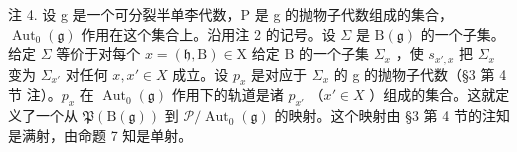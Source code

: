 注 4. 设 g 是一个可分裂半单李代数，P 是 g 的抛物子代数组成的集合，\(\operatorname{Aut}_{0}(\mathfrak{g})\) 作用在这个集合上。沿用注 2 的记号。设 \(\Sigma\) 是 \(\mathrm{B}(\mathfrak{g})\) 的一个子集。给定 \(\Sigma\) 等价于对每个 \(x = (\mathfrak{h}, \mathrm{B}) \in \mathrm{X}\) 给定 B 的一个子集 \(\Sigma_{x}\) ，使 \(s_{x',x}\) 把 \(\Sigma_{x}\) 变为 \(\Sigma_{x'}\) 对任何 \(x, x' \in X\) 成立。设 \(p_{x}\) 是对应于 \(\Sigma_{x}\) 的 g 的抛物子代数（§3 第 4 节 注）。\(p_{x}\) 在 \(\operatorname{Aut}_{0}(\mathfrak{g})\) 作用下的轨道是诸 \(p_{x'}\) （\(x' \in X\) ）组成的集合。这就定义了一个从 \(\mathfrak{P}(\mathrm{B}(\mathfrak{g}))\) 到 \(\mathcal{P}/\operatorname{Aut}_{0}(\mathfrak{g})\) 的映射。这个映射由 §3 第 4 节的注知是满射，由命题 7 知是单射。

